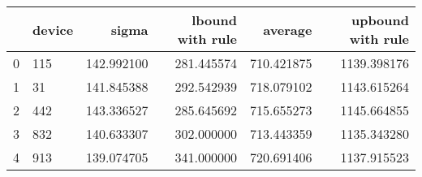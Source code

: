 \begin{tabular}{llrrrr}
\toprule
{} & device &       sigma &  lbound with rule &     average &  upbound with rule \\
\midrule
0 &    115 &  142.992100 &        281.445574 &  710.421875 &        1139.398176 \\
1 &     31 &  141.845388 &        292.542939 &  718.079102 &        1143.615264 \\
2 &    442 &  143.336527 &        285.645692 &  715.655273 &        1145.664855 \\
3 &    832 &  140.633307 &        302.000000 &  713.443359 &        1135.343280 \\
4 &    913 &  139.074705 &        341.000000 &  720.691406 &        1137.915523 \\
\bottomrule
\end{tabular}
